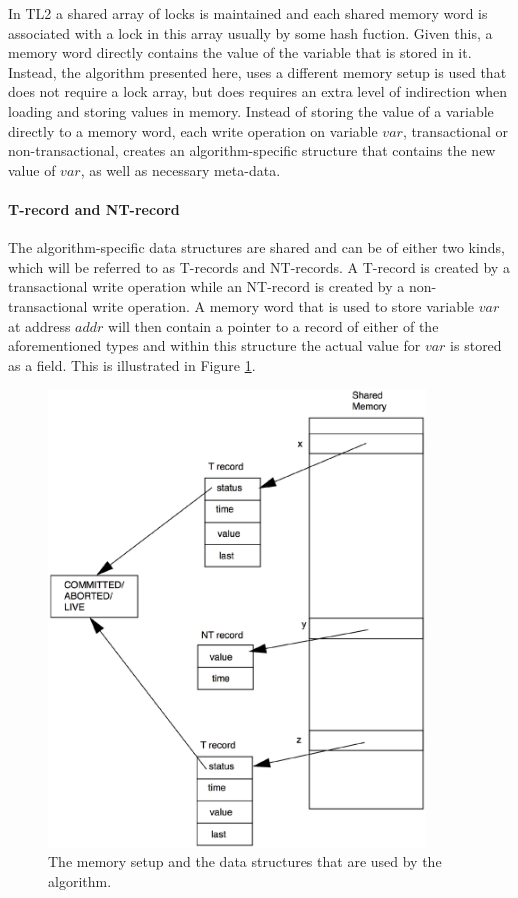 \documentclass[11pt,letterpaper]{article}
\begin{document}
In TL2 a  shared array of locks is maintained and each
shared memory word  
is associated with a lock in this array usually by some hash fuction. Given this, a memory
word directly contains  
the value of the variable that  is stored in it.
Instead, the algorithm presented here, uses
a  different memory setup is used that does not require a lock array, but does requires
an extra level of indirection when loading and storing values in memory.
Instead of storing the value of a variable directly to a memory word,
each  write  operation  on  variable  $\mathit{var}$,   transactional  or
non-transactional, creates an algorithm-specific   
structure that contains the new value of  $\mathit{var}$, as
well as necessary meta-data.



\paragraph{T-record  and NT-record}
The  algorithm-specific  data structures  are shared  and  can be  of 
either  two  kinds, which will be referred   to as T-records and NT-records. 
A T-record is created by a transactional write operation while an 
NT-record is created by a  non-transactional write operation. A memory word
that is used to store  
variable $\mathit{var}$ at address $\mathit{addr}$ will then contain a pointer to a  
record of either of the  aforementioned types and within this structure
the actual value for  $\mathit{var}$ is stored as a field. 
This  is illustrated in Figure  \ref{fig:mem_setup}.

\begin{figure}[h]
\centerline{
    \mbox{\includegraphics[width=100mm]{imgs/mem_setup_single.eps}}
}
\caption{The memory setup and the data structures that are used by the 
algorithm.}
\label{fig:mem_setup}
\end{figure}
\end{document}
